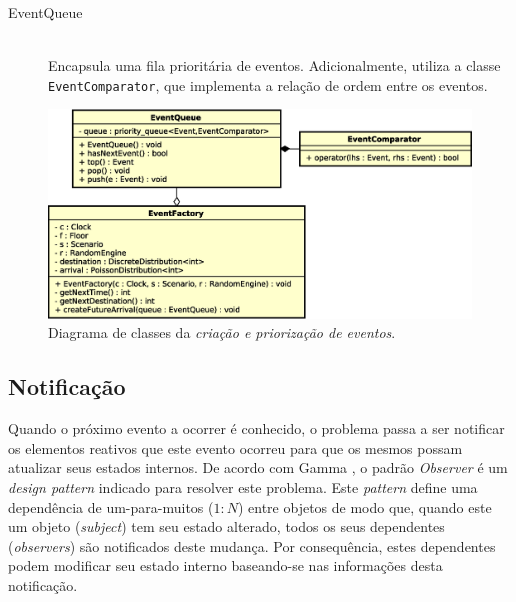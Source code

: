 \begin{description}
  \item[EventQueue] \hfill \\
    Encapsula uma fila prioritária de eventos. Adicionalmente, utiliza a classe
    \texttt{EventComparator}, que implementa a relação de ordem entre os
    eventos.

\end{description}

\begin{figure}[htb!]
  \centering
  \includegraphics[scale=0.6]{img/EventQueue}
  \caption{Diagrama de classes da \textit{criação e priorização de eventos}.}
\label{fig:diagram:event:manage}
\end{figure}

\subsection{Notificação}

Quando o próximo evento a ocorrer é conhecido, o problema passa a ser notificar
os elementos reativos que este evento ocorreu para que os mesmos possam
atualizar seus estados internos. De acordo com Gamma
\cite{Gamma:1995:DPE:186897}, o padrão \textit{Observer} é um \textit{design
pattern} indicado para resolver este problema. Este \textit{pattern} define uma
dependência de um-para-muitos ($1:N$) entre objetos de modo que, quando este um
objeto (\textit{subject}) tem seu estado alterado, todos os seus dependentes
(\textit{observers}) são notificados deste mudança. Por consequência, estes
dependentes podem modificar seu estado interno baseando-se nas informações desta
notificação.

